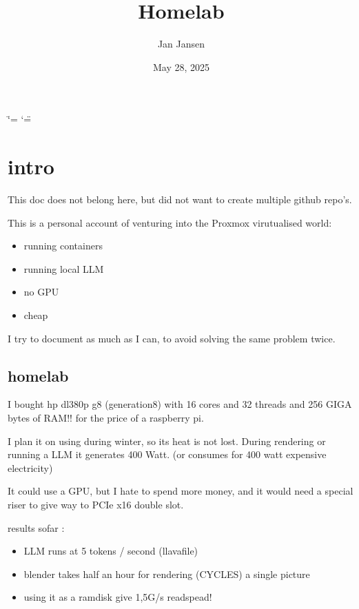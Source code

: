 \documentclass[letterpaper,10pt,english]{sphinxmanual}
\title{Homelab}
\date{May 28, 2025}
\author{Jan Jansen}
\begin{document}
\ifdefined\shorthandoff
  \ifnum\catcode`\=\string=\active\shorthandoff{=}\fi
  \ifnum\catcode`\"=\active{}\fi
\fi

\pagestyle{empty}
\sphinxmaketitle
\pagestyle{plain}
\sphinxtableofcontents
\pagestyle{normal}
\label{\detokenize{index::doc}}


\sphinxstepscope


\chapter{intro}
\label{\detokenize{intro:intro}}\label{\detokenize{intro::doc}}
\sphinxAtStartPar
This doc does not belong here, but did not want to create multiple github repo’s.

\sphinxAtStartPar
This is a personal account of venturing into the Proxmox virutualised world:
\begin{itemize}
\item {} 
\sphinxAtStartPar
running containers

\item {} 
\sphinxAtStartPar
running local LLM

\item {} 
\sphinxAtStartPar
no GPU

\item {} 
\sphinxAtStartPar
cheap

\end{itemize}

\sphinxAtStartPar
I try to document as much as I can, to avoid solving the same problem twice.


\section{homelab}
\label{\detokenize{intro:homelab}}
\sphinxAtStartPar
I bought hp dl380p g8 (generation8) with 16 cores and 32 threads and 256 GIGA bytes of RAM!! for the price of a raspberry pi.

\sphinxAtStartPar
I plan it on using during winter, so its heat is not lost. During rendering or running a LLM it generates 400 Watt. (or consumes for 400 watt expensive electricity)

\sphinxAtStartPar
It could use a GPU, but I hate to spend more money, and it would need a special riser to give way to PCIe x16 double slot.

\sphinxAtStartPar
results sofar :
\begin{itemize}
\item {} 
\sphinxAtStartPar
LLM runs at 5 tokens / second (llavafile)

\item {} 
\sphinxAtStartPar
blender takes half an hour for rendering (CYCLES) a single picture

\item {} 
\sphinxAtStartPar
using it as a  ramdisk give 1,5G/s readspead!

\end{itemize}
\end{document}
